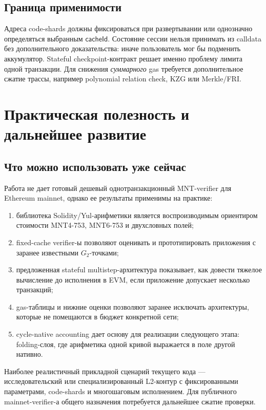 \documentclass[12pt,a4paper]{article}
\begin{document}
\subsection{Граница применимости}

Адреса code-shards должны фиксироваться при развертывании или однозначно
определяться выбранным $\mathsf{cacheId}$. Состояние сессии нельзя принимать
из calldata без дополнительного доказательства: иначе пользователь мог бы
подменить аккумулятор. Stateful checkpoint-контракт решает именно проблему
лимита одной транзакции. Для снижения \emph{суммарного} gas требуется
дополнительное сжатие трассы, например polynomial relation check, KZG или
Merkle/FRI.

\section{Практическая полезность и дальнейшее развитие}

\subsection{Что можно использовать уже сейчас}

Работа не дает готовый дешевый однотранзакционный MNT-verifier для Ethereum
mainnet, однако ее результаты применимы на практике:
\begin{enumerate}
    \item библиотека Solidity/Yul-арифметики является воспроизводимым
    ориентиром стоимости MNT4-753, MNT6-753 и двухсловных полей;
    \item fixed-cache verifier-ы позволяют оценивать и прототипировать
    приложения с заранее известными $G_2$-точками;
    \item предложенная stateful multistep-архитектура показывает, как довести
    тяжелое вычисление до исполнения в EVM, если приложение допускает
    несколько транзакций;
    \item gas-таблицы и нижние оценки позволяют заранее исключать архитектуры,
    которые не помещаются в бюджет конкретной сети;
    \item cycle-native accounting дает основу для реализации следующего
    этапа: folding-слоя, где арифметика одной кривой выражается в поле другой
    нативно.
\end{enumerate}

Наиболее реалистичный прикладной сценарий текущего кода --- исследовательский
или специализированный L2-контур с фиксированными параметрами, code-shards и
многошаговым исполнением. Для публичного mainnet-verifier-а общего назначения
потребуется дальнейшее сжатие проверки.
\end{document}
